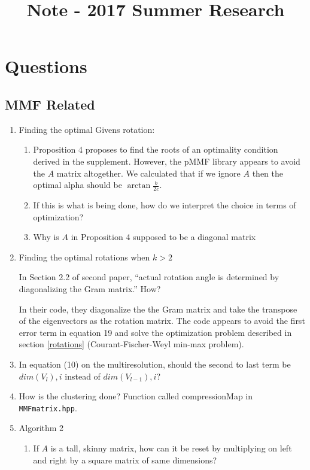 \documentclass[a4paper]{article}
\title{Note - 2017 Summer Research}
\begin{document}
\maketitle

\tableofcontents

\newpage
\section{Questions}

\subsection{MMF Related}
\begin{enumerate}
\item Finding the optimal Givens rotation: 
\begin{enumerate}
\item Proposition 4 proposes to find the roots of an optimality condition derived in the supplement. However, the pMMF library appears to avoid the $A$ matrix altogether. We calculated that if we ignore $A$ then the optimal alpha should be $\arctan \frac{b}{2c}$.
\item If this is what is being done, how do we interpret the choice in terms of optimization?
\item Why is $A$ in Proposition 4 supposed to be a diagonal matrix  
\end{enumerate}
\item Finding the optimal rotations when $k>2$

In Section 2.2 of second paper, ``actual rotation angle is determined by diagonalizing the Gram matrix.'' How?

In their code, they diagonalize the the Gram matrix and take the transpose of the eigenvectors as the rotation matrix. The code appears to avoid the first error term in equation 19 and solve the optimization problem described in section \ref{rotations}  (Courant-Fischer-Weyl min-max problem).

\item In equation (10) on the multiresolution, should the second to last term be $dim(V_l),i$ instead of $dim(V_{l-1}),i$?
\item How is the clustering done?
Function called compressionMap in \verb|MMFmatrix.hpp|.

\item Algorithm 2
\begin{enumerate}

\item If $A$ is a tall, skinny matrix, how can it be reset by multiplying on left and right by a square matrix of same dimensions?



\end{enumerate}
\end{enumerate}
\end{document}
